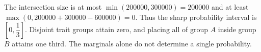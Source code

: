 The intersection size is at most $\min(200000,300000)=200000$ and at least $\max(0,200000+300000-600000)=0$. Thus the sharp probability interval is $\boxed{[0,\dfrac{1}{3}]}$. Disjoint trait groups attain zero, and placing all of group $A$ inside group $B$ attains one third. The marginals alone do not determine a single probability.
